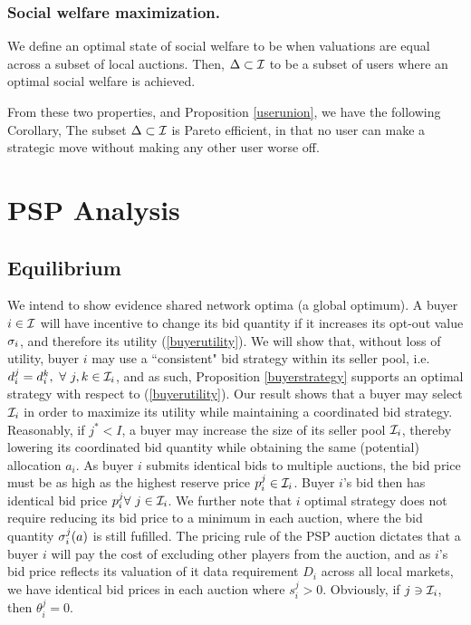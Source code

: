 \subsubsection{Social welfare maximization.}
We define an optimal state of social welfare to be when valuations are equal
across a subset of local auctions. Then, $\Delta\subset \mathcal{I}$ to be a subset of
users where an optimal social welfare is achieved.  

From these two properties, and Proposition \ref{userunion}, we have the
following Corollary, 
{
    The subset $\Delta\subset \mathcal{I}$ is Pareto efficient, in that no user can
    make a strategic move without making any other user worse off.
}

\section{PSP Analysis}\label{analysis}


\subsection{Equilibrium}

We intend to show evidence shared network optima (a
global optimum). 
A buyer $i\in\mathcal{I}$ will have incentive to change its bid
quantity if it increases its opt-out value $\sigma_i$, and therefore its utility (\ref{buyerutility}). 
We will show that, without loss of utility, buyer $i$ may  
use a ``consistent" bid strategy within its seller pool, i.e. $d_i^j = d_i^k, \
\forall \ j,k \in \mathcal{I}_i$, and as such,
Proposition \ref{buyerstrategy} supports an optimal strategy with respect to
(\ref{buyerutility}). 
Our result shows that a buyer may select $\mathcal{I}_i$ in order to maximize its
utility while maintaining a coordinated bid strategy. 
Reasonably, if $j^*< I$, a buyer may increase the size of its seller pool
$\mathcal{I}_i$, thereby lowering its coordinated bid
quantity while obtaining the same (potential) allocation $a_i$. 
As buyer $i$ submits identical bids to multiple auctions, the bid price must be
as high as the highest reserve price $p_i^j \in \mathcal{I}_i$.
Buyer $i$'s bid then has identical bid price $p_i^j \forall \ j \in\mathcal{I}_i$. 
We further note that $i$ optimal strategy does not require reducing its bid price to a
minimum in each auction, where
the bid quantity $\sigma_i^j(a)$ is still fufilled. The pricing rule of the PSP
auction dictates that a buyer $i$ will pay the cost of excluding other players from
the auction, and as $i$'s bid price reflects its valuation of it data
requirement $D_i$ across all local markets, we have identical bid prices in
each auction where $s_i^j>0$. Obviously, if $j\ni\mathcal{I}_i$, then $\theta_i^j = 0$.

